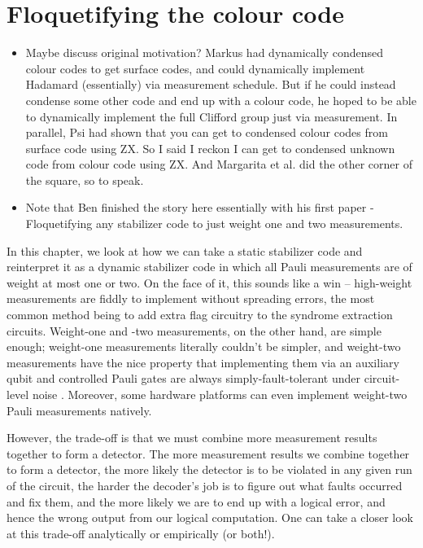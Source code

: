 \chapter{Floquetifying the colour code}\label{ch:floquetifying}

\begin{itemize}
    \item Maybe discuss original motivation? Markus had dynamically condensed colour codes to get surface codes, and could dynamically implement Hadamard (essentially) via measurement schedule. But if he could instead condense some other code and end up with a colour code, he hoped to be able to dynamically implement the full Clifford group just via measurement. In parallel, Psi had shown that you can get to condensed colour codes from surface code using ZX. So I said I reckon I can get to condensed unknown code from colour code using ZX. And Margarita et al. did the other corner of the square, so to speak.
    \item Note that Ben finished the story here essentially with his first paper - Floquetifying any stabilizer code to just weight one and two measurements.
\end{itemize}

In this chapter, we look at how we can take a static stabilizer code and reinterpret it as a dynamic stabilizer code in which all Pauli measurements are of weight at most one or two.
On the face of it, this sounds like a win -- high-weight measurements are fiddly to implement without spreading errors, the most common method being to add extra flag circuitry to the syndrome extraction circuits.  Weight-one and -two measurements, on the other hand, are simple enough; weight-one measurements literally couldn't be simpler, and weight-two measurements have the nice property that implementing them via an auxiliary qubit and controlled Pauli gates are always simply-fault-tolerant under circuit-level noise .
Moreover, some hardware platforms can even implement weight-two Pauli measurements natively.

However, the trade-off is that we must combine more measurement results together to form a detector.
The more measurement results we combine together to form a detector, the more likely the detector is to be violated in any given run of the circuit, the harder the decoder's job is to figure out what faults occurred and fix them, and the more likely we are to end up with a logical error, and hence the wrong output from our logical computation.
One can take a closer look at this trade-off analytically or empirically (or both!). 

